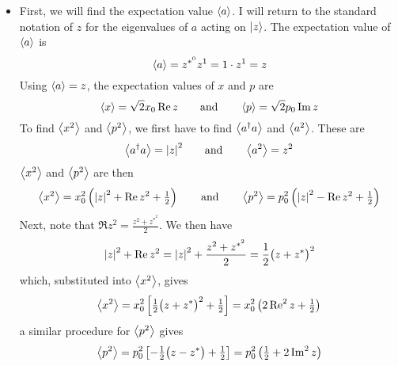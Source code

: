 \documentclass[11pt, a4paper]{article}
\newcommand{\eqtext}[1]{\qquad \text{#1} \qquad}
\begin{document}
\begin{itemize}
	\item First, we will find the expectation value $ \ev{a} $. I will return to the standard notation of $ z $ for the eigenvalues of $ a $ acting on $ \ket{z} $. The expectation value of $ \ev{a} $ is
	\begin{equation*}
		\ev{a} = z^{*^{0}}z^{1} = 1 \cdot z^{1} = z
	\end{equation*}
	Using $ \ev{a} = z $, the expectation values of $ x $ and $ p $ are
	\begin{equation*}
		\ev{x} = \sqrt{2} x_{0}\Re z \eqtext{and} \ev{p} = \sqrt{2}p_{0}\Im z
	\end{equation*}
	To find $ \ev{x^{2}} $ and $ \ev{p^{2}} $, we first have to find $ \ev{a^{\dagger}a} $ and $ \ev{a^{2}} $. These are
	\begin{equation*}
		\ev{a^{\dagger}a} = \abs{z}^{2} \eqtext{and} \ev{a^{2}} = z^{2}
	\end{equation*}
	$ \ev{x^{2}} $ and $ \ev{p^{2}} $ are then
	\begin{equation*}
		\ev{x^{2}} = x_{0}^{2} \left(\abs{z}^{2} + \Re z^{2} + \tfrac{1}{2}\right) \eqtext{and} \ev{p^{2}} = p_{0}^{2}\left(\abs{z}^{2} - \Re z^{2} + \tfrac{1}{2}\right)
	\end{equation*}
	Next, note that $ \Re z^{2} = \frac{z^{2}+z^{*^{2}}}{2}  $. We then have
	\begin{equation*}
		\abs{z}^{2} + \Re z^{2} = \abs{z}^{2} + \frac{z^{2}+z^{*^{2}}}{2} = \frac{1}{2}\big(z + z^{*}\big)^{2} 
	\end{equation*}
	which, substituted into $ \ev{x^{2}} $, gives
	\begin{equation*}
		\ev{x^{2}} = x_{0}^{2}\left[\tfrac{1}{2}\big(z + z^{*}\big)^{2} + \tfrac{1}{2}\right] = x_{0}^{2}\left(2 \Re^{2}z + \tfrac{1}{2}\right)
	\end{equation*}
	a similar procedure for $ \ev{p^{2}} $ gives
	\begin{equation*}
		\ev{p^{2}} = p_{0}^{2}\left[-\tfrac{1}{2}\big(z-z^{*}\big) + \tfrac{1}{2}\right] = p_{0}^{2}\left(\tfrac{1}{2} + 2 \Im^{2}z\right)
	\end{equation*}
	

\end{itemize}
\end{document}
